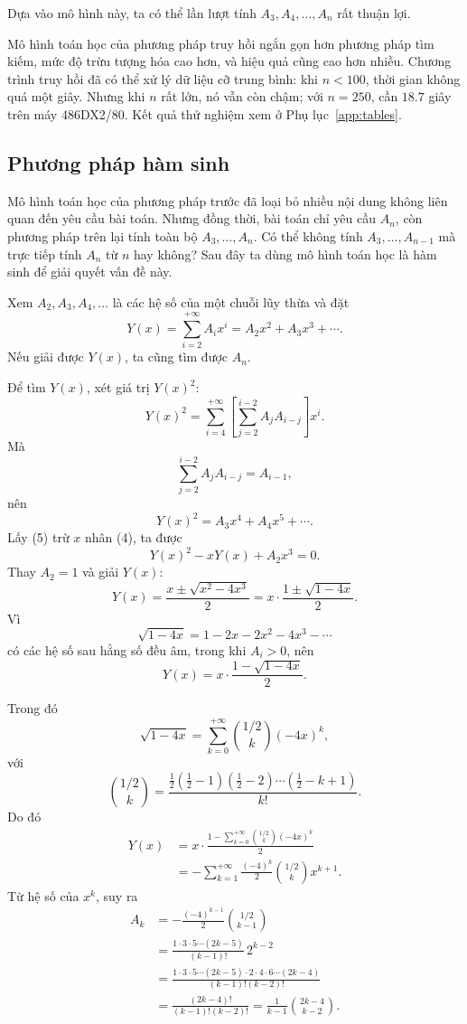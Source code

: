 \documentclass[11pt]{article}
\begin{document}
Dựa vào mô hình này, ta có thể lần lượt tính \(A_3,A_4,\ldots,A_n\) rất thuận
lợi.

Mô hình toán học của phương pháp truy hồi ngắn gọn hơn phương pháp tìm kiếm,
mức độ trừu tượng hóa cao hơn, và hiệu quả cũng cao hơn nhiều. Chương trình
truy hồi đã có thể xử lý dữ liệu cỡ trung bình: khi \(n<100\), thời gian không
quá một giây. Nhưng khi \(n\) rất lớn, nó vẫn còn chậm; với \(n=250\), cần
\(18.7\) giây trên máy 486DX2/80. Kết quả thử nghiệm xem ở
Phụ lục~\ref{app:tables}.

\subsection{Phương pháp hàm sinh}

Mô hình toán học của phương pháp trước đã loại bỏ nhiều nội dung không liên
quan đến yêu cầu bài toán. Nhưng đồng thời, bài toán chỉ yêu cầu \(A_n\), còn
phương pháp trên lại tính toàn bộ \(A_3,\ldots,A_n\). Có thể không tính
\(A_3,\ldots,A_{n-1}\) mà trực tiếp tính \(A_n\) từ \(n\) hay không? Sau đây
ta dùng mô hình toán học là hàm sinh để giải quyết vấn đề này.

Xem \(A_2,A_3,A_4,\ldots\) là các hệ số của một chuỗi lũy thừa và đặt
\[
  Y(x)=\sum_{i=2}^{+\infty} A_i x^i
      =A_2x^2+A_3x^3+\cdots. \tag{4}
\]
Nếu giải được \(Y(x)\), ta cũng tìm được \(A_n\).

Để tìm \(Y(x)\), xét giá trị \(Y(x)^2\):
\[
  Y(x)^2=\sum_{i=4}^{+\infty}
  \left[\sum_{j=2}^{i-2} A_jA_{i-j}\right]x^i.
\]
Mà
\[
  \sum_{j=2}^{i-2} A_jA_{i-j}=A_{i-1},
\]
nên
\[
  Y(x)^2=A_3x^4+A_4x^5+\cdots. \tag{5}
\]
Lấy (5) trừ \(x\) nhân (4), ta được
\[
  Y(x)^2-xY(x)+A_2x^3=0.
\]
Thay \(A_2=1\) và giải \(Y(x)\):
\[
  Y(x)=\frac{x\pm\sqrt{x^2-4x^3}}{2}
      =x\cdot\frac{1\pm\sqrt{1-4x}}{2}.
\]
Vì
\[
  \sqrt{1-4x}=1-2x-2x^2-4x^3-\cdots
\]
có các hệ số sau hằng số đều âm, trong khi \(A_i>0\), nên
\[
  Y(x)=x\cdot\frac{1-\sqrt{1-4x}}{2}. \tag{6}
\]

Trong đó
\[
  \sqrt{1-4x}
  =\sum_{k=0}^{+\infty} \binom{1/2}{k}(-4x)^k,
\]
với
\[
  \binom{1/2}{k}
  =\frac{\frac12(\frac12-1)(\frac12-2)\cdots(\frac12-k+1)}{k!}.
\]
Do đó
\[
\begin{aligned}
Y(x)
&=x\cdot
  \frac{1-\sum_{k=0}^{+\infty}\binom{1/2}{k}(-4x)^k}{2} \\
&=-\sum_{k=1}^{+\infty}
  \frac{(-4)^k}{2}\binom{1/2}{k}x^{k+1}.
\end{aligned}
\]
Từ hệ số của \(x^k\), suy ra
\[
\begin{aligned}
A_k
&=-\frac{(-4)^{k-1}}{2}\binom{1/2}{k-1} \\
&=\frac{1\cdot3\cdot5\cdots(2k-5)}{(k-1)!}\,2^{k-2} \\
&=\frac{1\cdot3\cdot5\cdots(2k-5)\cdot2\cdot4\cdot6\cdots(2k-4)}
        {(k-1)!(k-2)!} \\
&=\frac{(2k-4)!}{(k-1)!(k-2)!}
 =\frac{1}{k-1}\binom{2k-4}{k-2}.
\end{aligned}
\]
\end{document}

